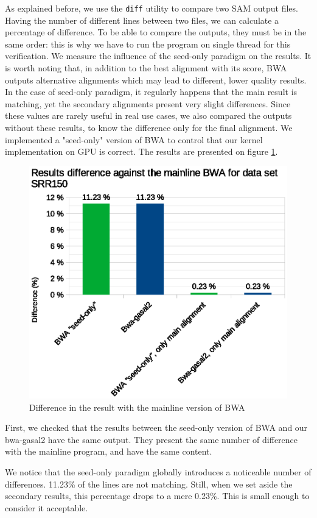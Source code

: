 
As explained before, we use the \verb|diff| utility to compare two SAM output files. Having the number of different lines between two files, we can calculate a percentage of difference. To be able to compare the outputs, they must be in the same order: this is why we have to run the program on single thread for this verification. We measure the influence of the seed-only paradigm on the results. It is worth noting that, in addition to the best alignment with its score, BWA outputs alternative alignments which may lead to different, lower quality results. In the case of seed-only paradigm, it regularly happens that the main result is matching, yet the secondary alignments present very slight differences. Since these values are rarely useful in real use cases, we also compared the outputs without these results, to know the difference only for the final alignment. We implemented a "seed-only" version of BWA to control that our kernel implementation on GPU is correct. The results are presented on figure \ref{fig:result-diff-srr150}.

\begin{figure}[h!]
	\centering
	\includegraphics[width=1\linewidth]{srr150/result-diff-srr150}
	\caption{Difference in the result with the mainline version of BWA}
	\label{fig:result-diff-srr150}
\end{figure}

First, we checked that the results between the seed-only version of BWA and our bwa-gasal2 have the same output. They present the same number of difference with the mainline program, and have the same content.

We notice that the seed-only paradigm globally introduces a noticeable number of differences. 11.23\% of the lines are not matching. Still, when we set aside the secondary results, this percentage drops to a mere 0.23\%. This is small enough to consider it acceptable.


